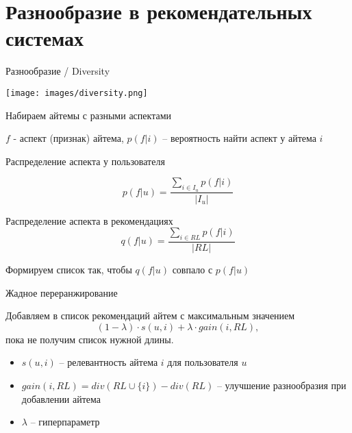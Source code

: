 \documentclass[11pt,aspectratio=169,handout]{beamer}
\begin{document}
\section{Разнообразие в рекомендательных системах}

\begin{frame}{Разнообразие / Diversity}

\begin{center}
\texttt{[image: images/diversity.png]}
\end{center}

\end{frame}

\begin{frame}{Набираем айтемы с разными аспектами}

$f$ - аспект (признак) айтема, $p(f | i)$ -- вероятность найти аспект у айтема $i$

\vfill

Распределение аспекта у пользователя

\[
p(f | u) = \frac{\sum_{i \in I_u} p(f | i)}{|I_u|}  
\]

Распределение аспекта в рекомендациях
\[
q(f | u) = \frac{\sum_{i \in RL} p(f | i)}{|RL|}
\]

\begin{tcolorbox}[colback=info!5,colframe=info!80,title=]
Формируем список так, чтобы $q(f | u)$ совпало с $p(f | u)$
\end{tcolorbox}

\end{frame}

\begin{frame}{Жадное переранжирование}

\begin{tcolorbox}[colback=info!5,colframe=info!80,title=]
Добавляем в список рекомендаций айтем с максимальным значением
\[
(1 - \lambda) \cdot s(u, i) + \lambda \cdot gain(i, RL),
\]
пока не получим список нужной длины.
\end{tcolorbox}

\vfill

\begin{itemize}
\item $s(u, i)$ -- релевантность айтема $i$ для пользователя $u$ 
\item $gain(i, RL) = div(RL \cup \{i\}) - div(RL)$ -- улучшение разнообразия при добавлении айтема
\item $\lambda$ -- гиперпараметр
\end{itemize}

\end{frame}
\end{document}
